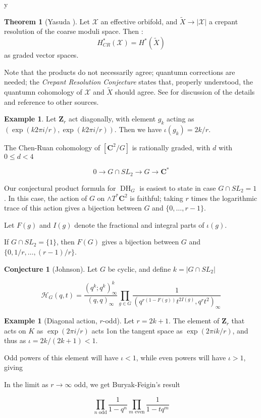 y\documentclass{amsart}[12pt]
\theoremstyle{definition}
\newtheorem{theorem}[dummy]{Theorem}
\newtheorem{example}[dummy]{Example}
\newtheorem{conjecture}[dummy]{Conjecture}
\newcommand{\Z}{\mathbf{Z}}
\newcommand{\C}{\mathbf{C}}
\DeclareMathOperator{\DC}{DH}
\begin{document}
\begin{theorem}[Yasuda \cite{yasuda}] \label{thm:yasuda}
Let $\mathcal{X}$ an effective orbifold, and $\widetilde{X}\to|\mathcal{X}|$ a crepant resolution of the coarse moduli space.  Then :
$$H_{CR}^*(\mathcal{X})=H^*(\widetilde{X})$$
as graded vector spaces.  
\end{theorem}

Note that the products do not necessarily agree; quantumn corrections are needed; the \emph{Crepant Resolution Conjecture} states that, properly understood, the quantumn cohomology of $\mathcal{X}$ and $\widetilde{X}$ should agree.  See \cite{CoatesRuan} for discussion of the details and reference to other sources.


\begin{example}
Let $\Z_r$ act diagonally, with element $g_k$ acting as $(\exp(k2\pi i/r),\exp(k2\pi i/r))$.  Then we have $\iota(g_k)=2k/r$.
\end{example}




The Chen-Ruan cohomology of $[\C^2/G]$ is rationally graded, with $d$ with $0\leq d < 4$


$$0\to G\cap SL_2\to G \to \C^*$$








Our conjectural product formula for $\DC_G$ is easiest to state in case $G\cap SL_2=1$.  In this case, the action of $G$ on $\wedge T^*\C^2$ is faithful; taking $r$ times the logarithmic trace of this action gives a bijection between $G$ and $\{0,\dots, r-1\}$.


Let $F(g)$ and $I(g)$ denote the fractional and integral parts of $\iota(g)$. 

If $G\cap SL_2=\{1\}$, then $F(G)$ gives a bijection between $G$ and $\{0, 1/r,\dots, (r-1)/r\}$.
\begin{conjecture}[Johnson] \label{conj:CR}
Let $G$ be cyclic, and define $k=|G\cap SL_2|$

$$\mathcal{H}_G(q,t)= \frac{(q^k;q^k)^k_\infty}{(q,q)_\infty} \prod_{g\in G}\frac{1}{(q^{r(1-F(g))} t^{2I(g)},q^rt^2)_\infty}$$

\end{conjecture}


\begin{example}[Diagonal action, $r$-odd]
Let $r=2k+1$.   The element of $\Z_r$ that acts on $K$ as $\exp(2\pi i/r)$ acts 1on the tangent space as $\exp(2\pi i k/r)$, and thus as $\iota=2k/(2k+1)<1$.  

Odd powers of this element will have $\iota<1$, while even powers will have $\iota>1$, giving 

In the limit as $r\to\infty$ odd, we get Buryak-Feigin's result

$$\prod_{n \text{ odd}} \frac{1}{1-q^n}\prod_{m \text{ even}}\frac{1}{1-tq^m}$$
\end{example}
\end{document}
